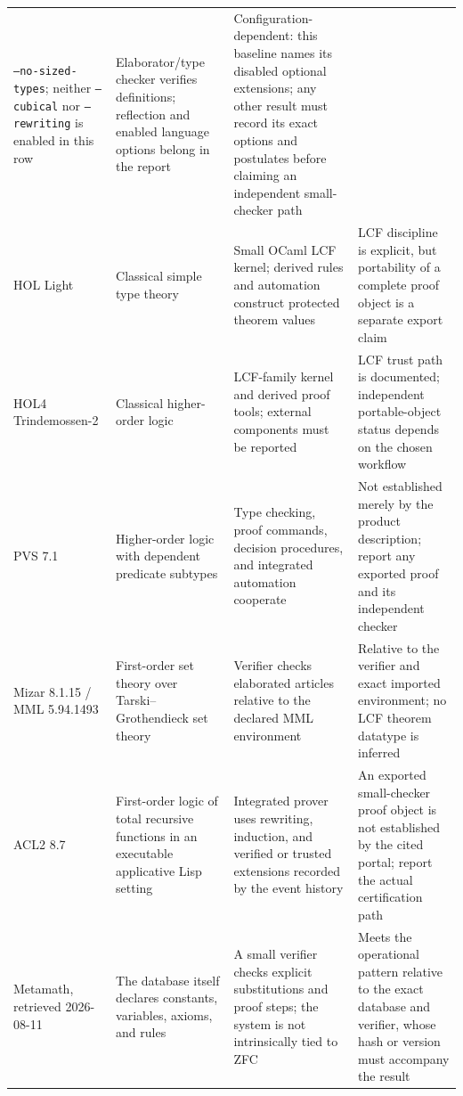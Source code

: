 \begin{landscape}
\begin{longtable}{@{}p{1.00in}p{1.85in}p{2.10in}p{2.15in}@{}}
\texttt{--no-sized-types}; neither \texttt{--cubical} nor
\texttt{--rewriting} is enabled in this row & Elaborator/type checker verifies
definitions; reflection and enabled language options belong in the report &
Configuration-dependent: this baseline names its disabled optional extensions;
any other result must record its exact options and postulates before claiming
an independent small-checker path \cite{AgdaReference2026} \\ \addlinespace
HOL Light & Classical simple type theory & Small OCaml LCF kernel; derived
rules and automation construct protected theorem values & LCF discipline is
explicit, but portability of a complete proof object is a separate export
claim \cite{HOLLightSite2026} \\ \addlinespace
HOL4 Trindemossen-2 & Classical higher-order logic & LCF-family kernel and
derived proof tools; external components must be reported & LCF trust path is
documented; independent portable-object status depends on the chosen workflow
\cite{HOL4Site2026} \\ \addlinespace
PVS 7.1 & Higher-order logic with dependent predicate subtypes & Type checking,
proof commands, decision procedures, and integrated automation cooperate &
Not established merely by the product description; report any exported proof
and its independent checker \cite{PVS71Documentation} \\ \addlinespace
Mizar 8.1.15 / MML 5.94.1493 & First-order set theory over
Tarski--Grothendieck set theory & Verifier checks elaborated articles relative
to the declared MML environment & Relative to the verifier and exact imported
environment; no LCF theorem datatype is inferred
\cite{MizarLibrary2026} \\ \addlinespace
ACL2 8.7 & First-order logic of total recursive functions in an executable
applicative Lisp setting & Integrated prover uses rewriting, induction, and
verified or trusted extensions recorded by the event history & An exported
small-checker proof object is not established by the cited portal; report the
actual certification path \cite{ACL2Documentation2026} \\ \addlinespace
Metamath, retrieved 2026-08-11 & The database itself declares constants,
variables, axioms, and rules & A small verifier checks explicit substitutions
and proof steps; the system is not intrinsically tied to ZFC & Meets the
operational pattern relative to the exact database and verifier, whose hash or
version must accompany the result \cite{MetamathSite2026} \\
\bottomrule
\end{longtable}
\endgroup
\end{landscape}

